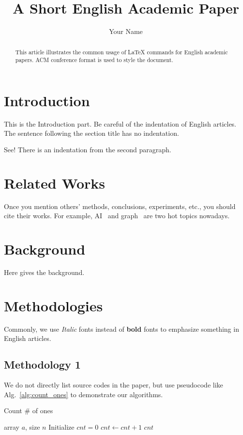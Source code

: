 \documentclass[sigconf]{acmart}
\title{A Short English Academic Paper}
\author{Your Name}
\affiliation{%
  \institution{Your Affiliation}
}
\begin{document}
\begin{abstract}
This article illustrates the common usage of \LaTeX{} commands for English academic papers.
ACM conference format is used to style the document.
\end{abstract}

\maketitle

\section{Introduction}
This is the Introduction part.
Be careful of the indentation of English articles.
The sentence following the section title has no indentation.

See! There is an indentation from the second paragraph.

\section{Related Works}
Once you mention others' methods, conclusions, experiments, etc., you should cite their works.
For example, AI~\cite{sivathanu_astra_2019,hua_boosting_2019,deng_tie_2019,frankle_lottery_2019} and graph~\cite{ma_neugraph_2019,besta_slim_2019,dhulipala_low-latency_2019,dong_network_2019} are two hot topics nowadays.

\section{Background}
Here gives the background.

\section{Methodologies}
Commonly, we use \emph{Italic} fonts instead of \textbf{bold} fonts to emphasize something in English articles.

\subsection{Methodology 1}
We do not directly list source codes in the paper, but use pseudocode like Alg.~\ref{alg:count_ones} to demonstrate our algorithms.
\begin{algorithm}[htbp]
\caption{Count \# of ones}
\label{alg:count_ones}
\small
\begin{algorithmic}[1]  
\REQUIRE array $a$, size $n$
\STATE Initialize $cnt = 0$
\STATE $cnt \gets cnt + 1$
\ENDIF
\ENDFOR
\RETURN $cnt$
\end{algorithmic}
\end{algorithm}
\end{document}
